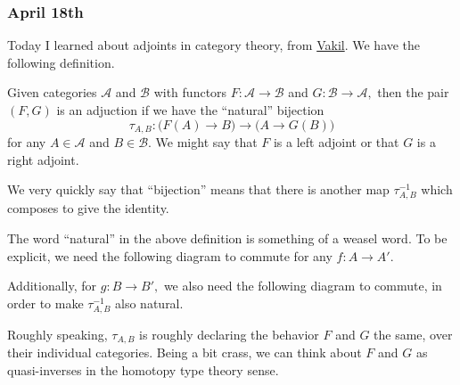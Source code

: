 \subsubsection{April 18th}
Today I learned about adjoints in category theory, from \href{https://web.archive.org/web/20210414151805/http://math.stanford.edu/~vakil/216blog/FOAGnov1817public.pdf}{Vakil}. We have the following definition.
\begin{definition}
    Given categories $\mathcal A$ and $\mathcal B$ with functors $F:\mathcal A\to\mathcal B$ and $G:\mathcal B\to\mathcal A,$ then the pair $(F,G)$ is an adjuction if we have the ``natural'' bijection
    \[\tau_{A,B}:\big(F(A)\to B\big)\to\big(A\to G(B)\big)\]
    for any $A\in\mathcal A$ and $B\in\mathcal B.$ We might say that $F$ is a left adjoint or that $G$ is a right adjoint.
\end{definition}
We very quickly say that ``bijection'' means that there is another map $\tau_{A,B}^{-1}$ which composes to give the identity.

The word ``natural'' in the above definition is something of a weasel word. To be explicit, we need the following diagram to commute for any $f:A\to A'.$
\begin{center}
\end{center}
Additionally, for $g:B\to B',$ we also need the following diagram to commute, in order to make $\tau_{A,B}^{-1}$ also natural.
\begin{center}
\end{center}
Roughly speaking, $\tau_{A,B}$ is roughly declaring the behavior $F$ and $G$ the same, over their individual categories. Being a bit crass, we can think about $F$ and $G$ as quasi-inverses in the homotopy type theory sense.

